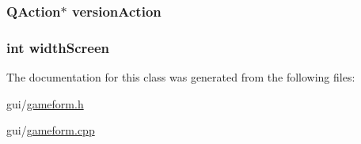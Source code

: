 \subsubsection[{\texorpdfstring{version\+Action}{versionAction}}]{\setlength{\rightskip}{0pt plus 5cm}Q\+Action$\ast$ version\+Action\hspace{0.3cm}{\ttfamily [private]}}\hypertarget{classGameForm_a4f38a2d30e7f01b923b0d9e3f9f2e048}{}\label{classGameForm_a4f38a2d30e7f01b923b0d9e3f9f2e048}
\subsubsection[{\texorpdfstring{width\+Screen}{widthScreen}}]{\setlength{\rightskip}{0pt plus 5cm}int width\+Screen\hspace{0.3cm}{\ttfamily [private]}}\hypertarget{classGameForm_aacecc4646535564c1445645a8161dc5f}{}\label{classGameForm_aacecc4646535564c1445645a8161dc5f}


The documentation for this class was generated from the following files\+:\begin{DoxyCompactItemize}
\item 
gui/\hyperlink{gameform_8h}{gameform.\+h}\item 
gui/\hyperlink{gameform_8cpp}{gameform.\+cpp}\end{DoxyCompactItemize}
